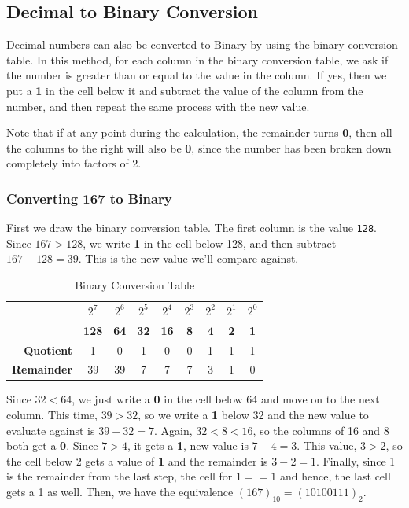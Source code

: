\subsection{Decimal to Binary Conversion}
Decimal numbers can also be converted to Binary by using the binary conversion table. In this method, for each column in the binary conversion table, we ask if the number is greater than or equal to the value in the column. If yes, then we put a \textbf{1} in the cell below it and subtract the value of the column from the number, and then repeat the same process with the new value. 

Note that if at any point during the calculation, the remainder turns \textbf{0}, then all the columns to the right will also be \textbf{0}, since the number has been broken down completely into factors of 2. 

\subsubsection{Converting 167 to Binary}
First we draw the binary conversion table. The first column is the value \verb|128|. Since $167>128$, we write \textbf{1} in the cell below 128, and then subtract $167-128=39$. This is the new value we'll compare against. 

\begin{table}[H]
	\centering
	\begin{tabular}{rcccccccc}
		\toprule
		&$2^7$ &$2^6$ &$2^5$ &$2^4$ &$2^3$ &$2^2$ &$2^1$ &$2^0$ \\
		&\textbf{128} &\textbf{64} &\textbf{32} &\textbf{16} &\textbf{8} &\textbf{4} &\textbf{2} &\textbf{1} \\
		\midrule
		\textbf{Quotient} &1 &0 &1 &0 &0 &1 &1 &1 \\
		\midrule
		\textbf{Remainder} &39 &39 &7 &7 &7 &3 &1 &0 \\
		\bottomrule
	\end{tabular}
	\vspace{-5pt}
	\caption{Binary Conversion Table}
\end{table}
\vspace{-10pt}

\noindent
Since $32<64$, we just write a \textbf{0} in the cell below 64 and move on to the next column. This time, $39>32$, so we write a \textbf{1} below 32 and the new value to evaluate against is $39-32=7$. Again, $32<8<16$, so the columns of 16 and 8 both get a \textbf{0}. Since $7>4$, it gets a \textbf{1}, new value is $7-4=3$. This value, $3>2$, so the cell below 2 gets a value of \textbf{1} and the remainder is $3-2=1$. Finally, since 1 is the remainder from the last step, the cell for $1 == 1$ and hence, the last cell gets a 1 as well. Then, we have the equivalence $(167)_{10} = (10100111)_2$.

